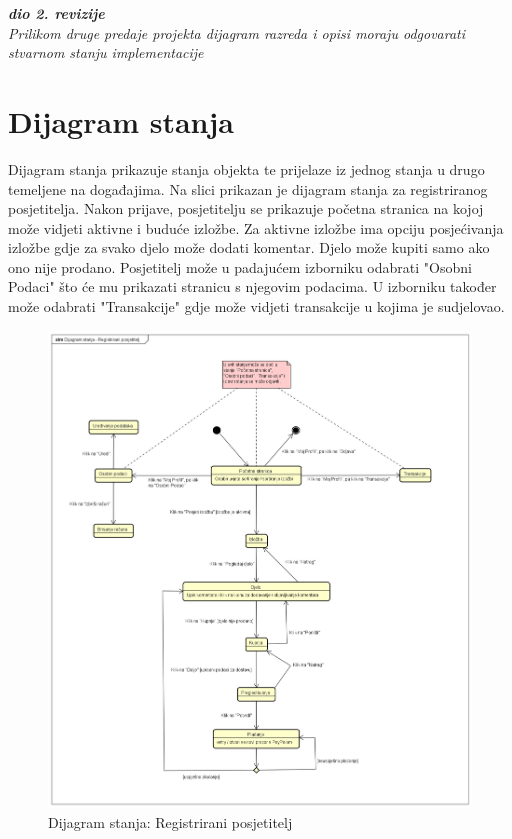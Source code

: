 {\begin{figure}[H]
			\end{figure}
			
			\textbf{\textit{dio 2. revizije}}\\		
				
			
			
		
			\textit{Prilikom druge predaje projekta dijagram razreda i opisi moraju odgovarati stvarnom stanju implementacije}
			
			
			
			
			\eject
			
		\section{Dijagram stanja}
		
			{Dijagram stanja prikazuje stanja objekta te prijelaze iz jednog stanja u drugo temeljene na događajima. Na slici prikazan je dijagram stanja za registriranog posjetitelja. Nakon prijave, posjetitelju se prikazuje početna stranica na kojoj može vidjeti aktivne i buduće izložbe. Za aktivne izložbe ima opciju posjećivanja izložbe gdje za svako djelo može dodati komentar. Djelo može kupiti samo ako ono nije prodano. Posjetitelj može u padajućem izborniku odabrati "Osobni Podaci" što će mu prikazati stranicu s njegovim podacima. U izborniku također može odabrati "Transakcije" gdje može vidjeti transakcije u kojima je sudjelovao.}
			
			\begin{figure}[H]
				
				\includegraphics[width=\textwidth,height=\textheight,keepaspectratio]{dijagram_stanja}
				\caption{Dijagram stanja: Registrirani posjetitelj}
				

\end{figure}}
